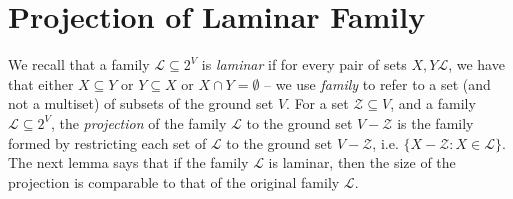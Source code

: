 \documentclass{article}
\newcommand{\shubhang}[1]{{\color{blue}[{\tiny Shubhang: \bf #1}]\marginpar{\color{blue}*}}}
\newcommand{\knote}[1]{{\color{red}[{\tiny Karthik: \bf #1}]\marginpar{\color{red}*}}}
\newcommand{\kristof}[1]{{\color{purple}[{\tiny Kristof: \bf #1}]\marginpar{\color{red}*}}}
\providecommand{\calL}{\mathcal{L}}
\providecommand{\calZ}{\mathcal{Z}}
\begin{document}
\section{Projection of Laminar Family}\label{appendix:sec:uncrossing-properties:projection-of-laminar-families}
We recall that 
a family $\calL \subseteq 2^V$ is \emph{laminar} if for every pair of sets $X, Y\calL$, we have that either $X\subseteq Y$ or $Y\subseteq X$ or $X\cap Y=\emptyset$  --  we use \emph{family} to refer to a set (and not a multiset) of subsets of the ground set $V$. 
For a set $\calZ\subseteq V$, and a family $\calL \subseteq 2^V$,
the \emph{projection} of the family $\calL$ to the ground set $V - \calZ$ is the family formed by restricting each set of $\calL$ to the ground set $V - \calZ$, i.e. $\{X - \calZ : X \in \calL\}$.
The next lemma says that if the family $\calL$ is laminar, then the size of the projection %
is comparable to that of the original family $\calL$.
\end{document}
